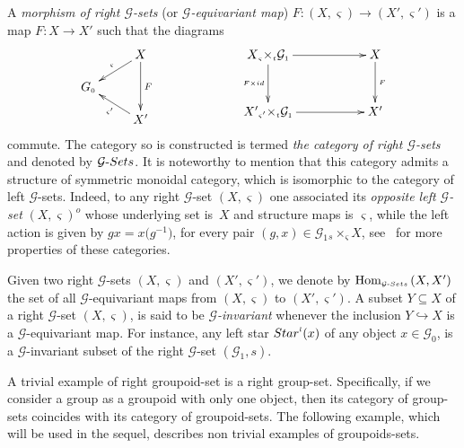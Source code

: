 \documentclass[11pt]{article}
\numberwithin{equation}{section}
\renewcommand{\hom}[3]{\mathrm{Hom}_{\Sscript{#1}}\left(#2, #3\right)}
\newcommand{\Go}{\cG_{\Sscript{0}}}
\newcommand{\Ga}{\cG_{\Sscript{1}}}
\newcommand{\Starl}[1]{{{\rm Star}}^{\Sscript{l}}(#1)}
\newcommand{\cG}{{\mathcal G}}
\newcommand{\Gsets}{\cG\text{-}{\rm Sets}}
\newcommand{\Sscript}[1]{\scriptscriptstyle{#1}}
\newcommand{\due}[3]{{}_{{#2 }} {#1}_{{ #3}} }
\begin{document}
A \emph{morphism of right $\cG$-sets} (or \emph{$\cG$-equivariant map}) $F\colon (X,\varsigma) \to (X',\varsigma')$ is a map $F\colon X \to X'$ such that the diagrams
\begin{gather}
\begin{gathered}
\xymatrix@R=12pt{ & X \ar@{->}_-{\Sscript{\varsigma}}[ld]
\ar@{->}^-{F}[dd] & \\ G_{\Sscript{0}}& & \\ & X'
\ar@{->}^-{\Sscript{\varsigma'}}[lu] & } \qquad \qquad
\xymatrix@R=12pt{X \due \times {\Sscript{\varsigma}} {
\Sscript{t}} \Ga \ar@{->}^-{}[rr] \ar@{->}_-{\Sscript{F \times
 {\rm id}}}[dd] & & X \ar@{->}^-{\Sscript{F}}[dd] \\ & & \\ X' \due
\times {\Sscript{\varsigma'}} { \Sscript{t}} \Ga
\ar@{->}^-{}[rr] & & X' }
\end{gathered}
\end{gather}
commute. The category so is constructed is termed \emph{the category of right $\cG$-sets} and denoted by $\Gsets$. It is noteworthy to mention that this category admits a structure of symmetric monoidal category, which is isomorphic to the category of left $\cG$-sets. Indeed, to any right $\cG$-set $(X,\varsigma)$ one associated its \emph{opposite left $\cG$-set} $(X, \varsigma)^{\Sscript{o}}$ whose underlying set is~$X$ and structure maps is $\varsigma$, while the left action is given by $g x = x\big(g^{-1}\big)$, for every pair $(g, x) \in \Ga \due \times {\Sscript{s}} { \Sscript{\varsigma}} X$, see~\cite{Kaoutit/Kowalzig:14} for more properties of these categories.

Given two right $\cG$-sets $(X,\varsigma)$ and $(X',\varsigma')$, we denote by $\hom{\Gsets}{X}{X'}$ the set of all $\cG$-equivariant maps from $(X,\varsigma)$ to $(X',\varsigma')$. A subset $Y \subseteq X$ of a right $\cG$-set $(X,\varsigma)$, is said to be \emph{$\cG$-invariant} whenever the inclusion $Y \hookrightarrow X$ is a $\cG$-equivariant map. For instance, any left star $\Starl{x}$ of any object $x \in\Go$, is a $\cG$-invariant subset of the right $\cG$-set $(\Ga, s)$.

A trivial example of right groupoid-set is a right group-set. Specifically, if we consider a group as a groupoid with only one object, then its category of group-sets coincides with its category of groupoid-sets. The following example, which will be used in the sequel, describes non trivial examples of groupoids-sets.
\end{document}
